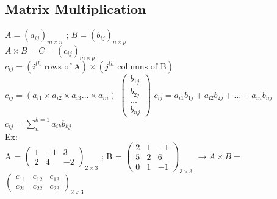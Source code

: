 \documentclass[12pt]{article}
\begin{document}
\subsection{Matrix Multiplication}
$A = (a_{ij})_{m \times n}$ ; $B = (b_{ij})_{n \times p}$ \\
$A \times B = C = (c_{ij})_{m \times p}$ \\
$c_{ij} = (i^{th} \mbox{ rows of A} ) \times (j^{th} \mbox{ columns of B})$ \\
$c_{ij} = (a_{i1} \times a_{i2} \times a_{i3} \ldots \times a_{in})$
$\begin{pmatrix}
b_{1j} \\
b_{2j} \\
\ldots \\
b_{nj}
\end{pmatrix}$
\bigbreak 
$c_{ij} = a_{i1} b_{1j} + a_{ì2} b_{2j} + \ldots + a_{in} b_{nj}$ \\
$c_{ij} = \displaystyle \sum_{n}^{k =1} a_{ik} b_{kj}$ \\
Ex: \\
A =
$\begin{pmatrix}
1 & -1 & 3 \\
2 & 4 & -2 
\end{pmatrix}_{2 \times 3}$
;
B = 
$\begin{pmatrix}
2 & 1 & -1 \\
5 & 2 & 6 \\
0 & 1 & -1
\end{pmatrix}_{3 \times 3}$
\bigbreak
$\rightarrow{A \times B = }$
$\begin{pmatrix}
c_{11} & c_{12} & c_{13} \\
c_{21} & c_{22} & c_{23} 
\end{pmatrix}_{2 \times 3}$
\end{document}
